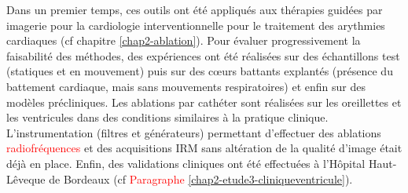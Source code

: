 Dans un premier temps, ces outils ont été appliqués aux thérapies guidées par imagerie pour la cardiologie interventionnelle pour le traitement des arythmies cardiaques (cf chapitre \ref{chap2-ablation}). Pour évaluer progressivement la faisabilité des méthodes, des expériences ont été réalisées sur des échantillons test (statiques et en mouvement) puis sur des cœurs battants explantés (présence du battement cardiaque, mais sans mouvements respiratoires) et enfin sur des modèles précliniques. Les ablations par cathéter sont réalisées sur les oreillettes et les ventricules dans des conditions similaires à la pratique clinique. L’instrumentation (filtres et générateurs) permettant d’effectuer des ablations \textcolor{red}{radiofréquences} et des acquisitions IRM sans altération de la qualité d’image était déjà en place. Enfin, des validations cliniques ont été effectuées à l’Hôpital Haut-Lêveque de Bordeaux (cf \textcolor{red}{Paragraphe} \ref{chap2-etude3-cliniqueventricule}).\\